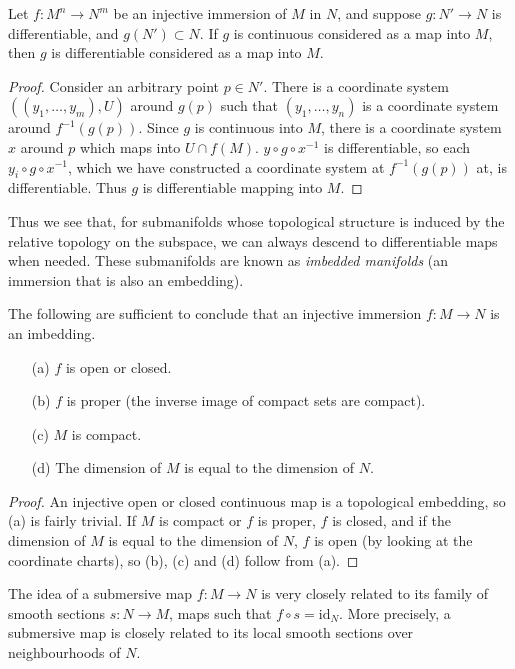 \begin{theorem}
    Let $f:M^n \to N^m$ be an injective immersion of $M$ in $N$, and suppose $g: N' \to N$ is differentiable, and $g(N') \subset N$. If $g$ is continuous considered as a map into $M$, then $g$ is differentiable considered as a map into $M$.
\end{theorem}
\begin{proof}
    Consider an arbitrary point $p \in N'$. There is a coordinate system $((y_1, \dots, y_m),U)$ around $g(p)$ such that $(y_1, \dots, y_n)$ is a coordinate system around $f^{-1}(g(p))$. Since $g$ is continuous into $M$, there is a coordinate system $x$ around $p$ which maps into $U \cap f(M)$. $y \circ g \circ x^{-1}$ is differentiable, so each $y_i \circ g \circ x^{-1}$, which we have constructed a coordinate system at $f^{-1}(g(p))$ at, is differentiable. Thus $g$ is differentiable mapping into $M$.
\end{proof}

Thus we see that, for submanifolds whose topological structure is induced by the relative topology on the subspace, we can always descend to differentiable maps when needed. These submanifolds are known as \emph{imbedded manifolds} (an immersion that is also an embedding).

\begin{theorem}
    The following are sufficient to conclude that an injective immersion $f: M \to N$ is an imbedding.
    \begin{enumerate}
        \item[(a)] $f$ is open or closed.
        \item[(b)] $f$ is proper (the inverse image of compact sets are compact).
        \item[(c)] $M$ is compact.
        \item[(d)] The dimension of $M$ is equal to the dimension of $N$.
    \end{enumerate}
\end{theorem}
\begin{proof}
    An injective open or closed continuous map is a topological embedding, so (a) is fairly trivial. If $M$ is compact or $f$ is proper, $f$ is closed, and if the dimension of $M$ is equal to the dimension of $N$, $f$ is open (by looking at the coordinate charts), so (b), (c) and (d) follow from (a).
\end{proof}

The idea of a submersive map $f: M \to N$ is very closely related to its family of smooth sections $s: N \to M$, maps such that $f \circ s = \text{id}_N$. More precisely, a submersive map is closely related to its local smooth sections over neighbourhoods of $N$.

